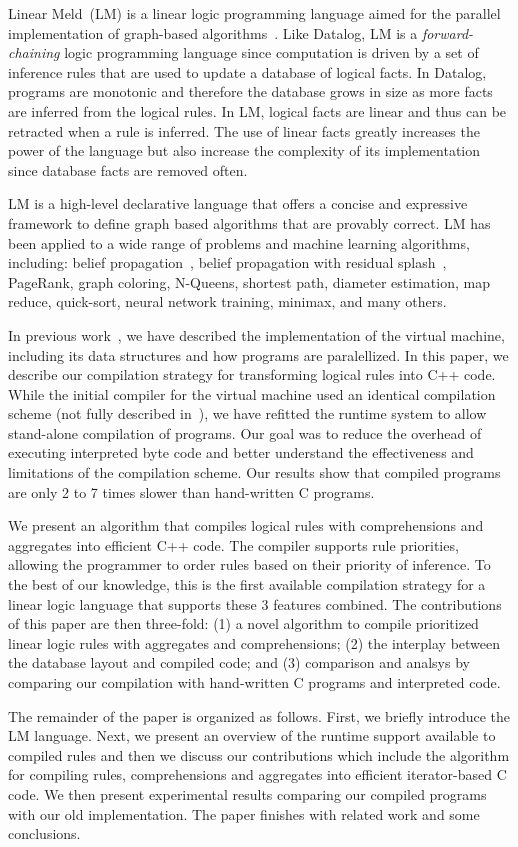Linear Meld~(LM) is a linear logic programming language
aimed for the parallel implementation of graph-based
algorithms~\cite{cruz-iclp14}. Like Datalog, LM is
a \emph{forward-chaining} logic programming language since computation is driven by a set of
inference rules that are used to update a database of logical facts. In Datalog,
programs are monotonic and therefore the database grows in size as more facts are
inferred from the logical rules. In LM, logical
facts are linear and thus can be retracted when a rule is inferred. The use of linear
facts greatly increases the power of the language but also increase the
complexity of its implementation since database facts are removed often.

LM is a high-level declarative language that offers a concise and
expressive framework to define graph based algorithms that are provably correct.
LM has been applied to a wide range of problems and machine learning
algorithms, including: belief propagation~\cite{Gonzalez+al:aistats09paraml},
belief propagation with residual splash~\cite{Gonzalez+al:aistats09paraml},
PageRank, graph coloring, N-Queens, shortest path, diameter estimation,
map reduce, quick-sort, neural network training, minimax, and many others.

In previous work~\cite{cruz-ppdp14}, we have described the implementation of the
virtual machine, including its data structures and how programs are
paralellized. In this paper, we describe our compilation strategy for
transforming logical rules into C++ code. While the initial compiler for the virtual
machine used an identical compilation scheme (not fully described
in~\cite{cruz-ppdp14}), we have refitted the runtime system to allow
stand-alone compilation of programs. Our goal was to reduce the overhead of executing
interpreted byte code and better understand the effectiveness and limitations of the
compilation scheme. Our results show that compiled programs are only 2 to 7
times slower than hand-written C programs.

We present an algorithm that compiles logical rules with comprehensions and
aggregates into efficient C++ code. The compiler supports rule priorities, allowing
the programmer to order rules based on their priority of inference. To the best
of our knowledge, this is the first available compilation strategy for a linear logic
language that supports these 3 features combined. The
contributions of this paper are then three-fold: (1) a novel algorithm to compile
prioritized linear logic rules with aggregates and comprehensions; (2) the
interplay between the database layout and compiled code; and (3) comparison and
analsys by comparing our compilation with
hand-written C programs and interpreted code.

The remainder of the paper is organized as follows. First, we briefly introduce
the LM language. Next, we present an overview of the runtime support available
to compiled rules and then we discuss our contributions which include the
algorithm for compiling rules, comprehensions and aggregates into efficient
iterator-based C code. We then present experimental results comparing our
compiled programs with our old implementation. The paper finishes with related
work and some conclusions.
